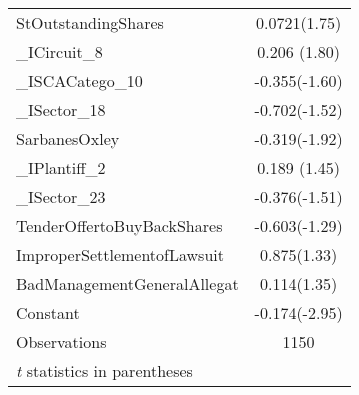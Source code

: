 \begin{table}[H]
\begin{tabular}{l*{1}{c}}
StOutstandingShares &      0.0721(1.75)\\
                  
\_ICircuit\_8         &       0.206 (1.80)\\
                   
\_ISCACatego\_10      &      -0.355(-1.60)\\
                    
\_ISector\_18         &      -0.702(-1.52)\\
                   
SarbanesOxley       &      -0.319(-1.92)\\
                    
\_IPlantiff\_2        &       0.189 (1.45)\\
                 
\_ISector\_23         &      -0.376(-1.51)\\
                                  
TenderOffertoBuyBackShares&      -0.603(-1.29)\\
                  
ImproperSettlementofLawsuit&       0.875(1.33)\\
              
BadManagementGeneralAllegat&       0.114(1.35)\\
                   
Constant            &      -0.174(-2.95)\\
\hline
Observations        &        1150\\
\hline\hline
\multicolumn{2}{l}{\footnotesize \textit{t} statistics in parentheses}\\
\end{tabular}
\end{table}

